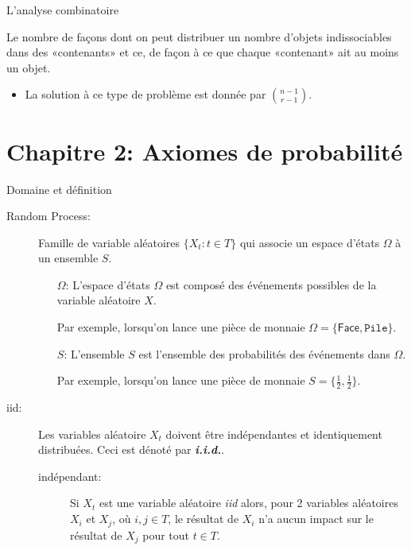 \documentclass[10pt, french]{article}
\begin{document}
\begin{multicols*}{3}
\begin{probch1}{L'analyse combinatoire}
\begin{description}
\begin{itemize}
	\end{itemize}
  \item[Solutions entières positives:] Le nombre de façons dont on peut distribuer un nombre d'objets indissociables dans des «contenants» et ce, de façon à ce que chaque «contenant» ait au moins un objet. 
  \begin{itemize}
	  \item La solution à ce type de problème est donnée par $\binom{n-1}{r-1}$.
  \end{itemize} 
\end{description}
\end{probch1}

\pagebreak
\section{Chapitre 2: Axiomes de probabilité}
\begin{rappel}{Domaine et définition}
\begin{description}
	\item[Random Process:]	Famille de variable aléatoires $\{X_{t}: t \in T\}$ qui associe un espace d'états $\Omega$ à un ensemble $S$.
	\begin{enumerate}
		\item[$\Omega$: ] L'espace d'états $\Omega$ est composé des événements possibles de la variable aléatoire $X$.
		\item[] Par exemple, lorsqu'on lance une pièce de monnaie $\Omega = \{\textsf{Face}, \texttt{Pile} \}$.
		\item[$S$: ] L'ensemble $S$ est l'ensemble des probabilités des événements dans $\Omega$.
		\item[] Par exemple, lorsqu'on lance une pièce de monnaie $S = \{\frac{1}{2}, \frac{1}{2} \}$.
	\end{enumerate}
\end{description}
\begin{description}
	\item[iid: ]	Les variables aléatoire $X_{t}$ doivent être indépendantes et identiquement distribuées. Ceci est dénoté par \textit{\textbf{i.i.d.}}.				
	\begin{description}
		\item[indépendant: ] Si $X_{t}$ est une variable aléatoire \textit{iid} alors, pour 2 variables aléatoires $X_{i}$ et $X_{j}$, où $i, j \in T$, le résultat de $X_{i}$ n'a aucun impact sur le résultat de $X_{j}$ pour tout $t \in T$.

\end{description}
\end{description}
\end{rappel}
\end{multicols*}
\end{document}
